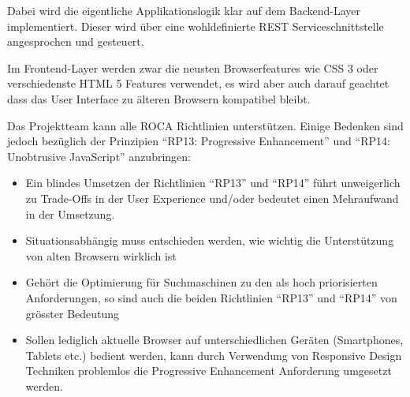 Dabei wird die eigentliche Applikationslogik klar auf dem Backend-Layer implementiert. Dieser wird über eine wohldefinierte REST Serviceschnittstelle  angesprochen und gesteuert.

Im Frontend-Layer werden zwar die neusten Browserfeatures wie CSS 3 oder verschiedenste HTML 5 Features verwendet, es wird aber auch darauf geachtet dass das User Interface zu älteren Browsern kompatibel bleibt.

Das Projektteam kann alle ROCA Richtlinien unterstützen. Einige Bedenken sind jedoch bezüglich der Prinzipien ``RP13: Progressive Enhancement'' und ``RP14: Unobtrusive JavaScript'' anzubringen:

\begin{itemize}
	\item Ein blindes Umsetzen der Richtlinien ``RP13'' und ``RP14'' führt unweigerlich zu Trade-Offs in der User Experience und/oder bedeutet einen Mehraufwand in der Umsetzung.
	\item Situationsabhängig muss entschieden werden, wie wichtig die Unterstützung von alten Browsern wirklich ist
	\item Gehört die Optimierung für Suchmaschinen zu den als hoch priorisierten Anforderungen, so sind auch die beiden Richtlinien ``RP13'' und ``RP14'' von grösster Bedeutung
	\item Sollen lediglich aktuelle Browser auf unterschiedlichen Geräten (Smartphones, Tablets etc.) bedient werden, kann durch Verwendung von Responsive Design Techniken \cite{ResponsiveDesign} problemlos die Progressive Enhancement Anforderung umgesetzt werden.
\end{itemize}